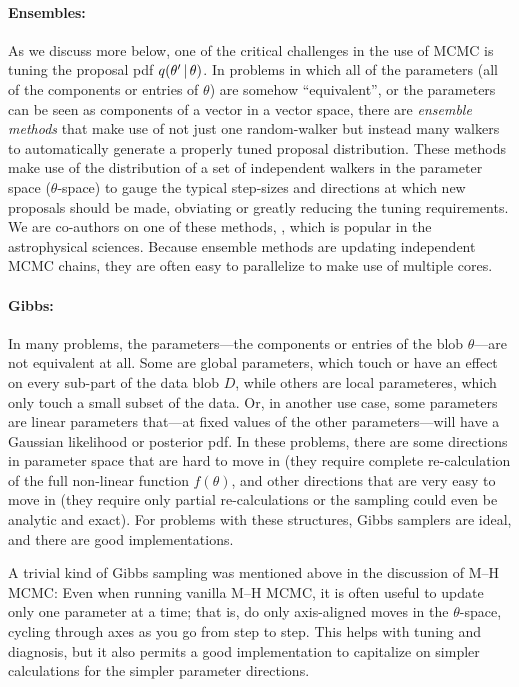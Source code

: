 \documentclass[12pt,twoside,pdftex]{article}
\newcommand{\data}{D}
\newcommand{\pars}{\theta}
\begin{document}

\paragraph{Ensembles:}
As we discuss more below, one of the critical challenges in the use of
MCMC is tuning the proposal pdf $q(\pars'\given\pars)$.
In problems in which all of the parameters (all of the components or entries of $\pars$) are somehow ``equivalent'',
or the parameters can be seen as components of a vector in a vector
space, there are \emph{ensemble methods} that make use of not just one
random-walker but instead many walkers to automatically generate a properly tuned
proposal distribution.
These methods make use of the distribution of a set of independent
walkers in the parameter space ($\pars$-space) to gauge the typical step-sizes and
directions at which new proposals should be made, obviating or greatly
reducing the tuning requirements.
We are co-authors on one of these methods, , which is popular in the astrophysical sciences.
Because ensemble methods are updating independent MCMC chains, they
are often easy to parallelize to make use of multiple cores.

\paragraph{Gibbs:}
In many problems, the parameters---the components or entries of the
blob $\pars$---are not equivalent at all.
Some are global parameters, which touch or have an effect on every
sub-part of the data blob $\data$, while others are local parameteres,
which only touch a small subset of the data.
Or, in another use case, some parameters are linear parameters
that---at fixed values of the other parameters---will have a Gaussian
likelihood or posterior pdf.
In these problems, there are some directions in parameter space that
are hard to move in (they require complete re-calculation of the full
non-linear function $f(\pars)$, and other directions that are very
easy to move in (they require only partial re-calculations or the
sampling could even be analytic and exact).
For problems with these structures, Gibbs samplers are ideal, and
there are good implementations.

A trivial kind of Gibbs sampling was mentioned above in the
discussion of M--H MCMC:
Even when running vanilla M--H MCMC, it is often useful to update only
one parameter at a time; that is, do only axis-aligned moves in the
$\pars$-space, cycling through axes as you go from step to step.
This helps with tuning and diagnosis, but it also permits a good
implementation to capitalize on simpler calculations for the simpler
parameter directions.
\end{document}

